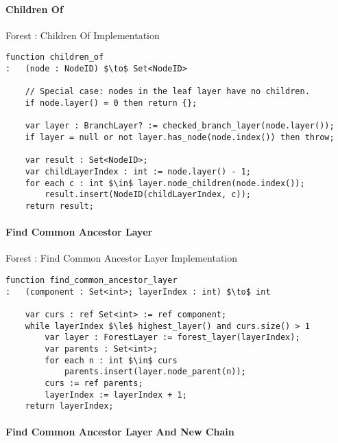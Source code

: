 \paragraph{Children Of}

\begin{stulisting}[H]
\caption{Forest : Children Of Implementation}
\begin{lstlisting}[style=Default]
function children_of
:	(node : NodeID) $\to$ Set<NodeID>

	// Special case: nodes in the leaf layer have no children.
	if node.layer() = 0 then return {};

	var layer : BranchLayer? := checked_branch_layer(node.layer());
	if layer = null or not layer.has_node(node.index()) then throw;

	var result : Set<NodeID>;
	var childLayerIndex : int := node.layer() - 1;
	for each c : int $\in$ layer.node_children(node.index());
		result.insert(NodeID(childLayerIndex, c));
	return result;
\end{lstlisting}
\end{stulisting}

\paragraph{Find Common Ancestor Layer}

\begin{stulisting}[H]
\caption{Forest : Find Common Ancestor Layer Implementation}
\label{code:appendixpf-findcommonancestorlayer}
\begin{lstlisting}[style=Default]
function find_common_ancestor_layer
:	(component : Set<int>; layerIndex : int) $\to$ int

	var curs : ref Set<int> := ref component;
	while layerIndex $\le$ highest_layer() and curs.size() > 1
		var layer : ForestLayer := forest_layer(layerIndex);
		var parents : Set<int>;
		for each n : int $\in$ curs
			parents.insert(layer.node_parent(n));
		curs := ref parents;
		layerIndex := layerIndex + 1;
	return layerIndex;
\end{lstlisting}
\end{stulisting}

\paragraph{Find Common Ancestor Layer And New Chain}

